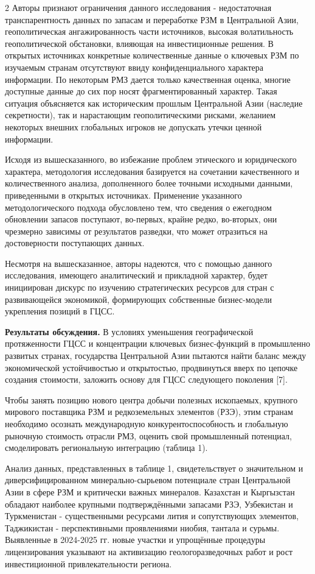 \begin{multicols}{2}
Авторы признают ограничения данного исследования - недостаточная
транспарентность данных по запасам и переработке РЗМ в Центральной Азии,
геополитическая ангажированность части источников, высокая волатильность
геополитической обстановки, влияющая на инвестиционные решения. В
открытых источниках конкретные количественные данные о ключевых РЗМ по
изучаемым странам отсутствуют ввиду конфиденциального характера
информации. По некоторым РМЗ дается только качественная оценка, многие
доступные данные до сих пор носят фрагментированный характер. Такая
ситуация объясняется как историческим прошлым Центральной Азии (наследие
секретности), так и нарастающим геополитическими рисками, желанием
некоторых внешних глобальных игроков не допускать утечки ценной
информации.

Исходя из вышесказанного, во избежание проблем этического и юридического
характера, методология исследования базируется на сочетании
качественного и количественного анализа, дополненного более точными
исходными данными, приведенными в открытых источниках. Применение
указанного методологического подхода обусловлено тем, что сведения о
ежегодном обновлении запасов поступают, во-первых, крайне редко,
во-вторых, они чрезмерно зависимы от результатов разведки, что может
отразиться на достоверности поступающих данных.

Несмотря на вышесказанное, авторы надеются, что с помощью данного
исследования, имеющего аналитический и прикладной характер, будет
инициирован дискурс по изучению стратегических ресурсов для стран с
развивающейся экономикой, формирующих собственные бизнес-модели
укрепления позиций в ГЦСС.

{\bfseries Результаты обсуждения.} В условиях уменьшения географической
протяженности ГЦСС и концентрации ключевых бизнес-функций в промышленно
развитых странах, государства Центральной Азии пытаются найти баланс
между экономической устойчивостью и открытостью, продвинуться вверх по
цепочке создания стоимости, заложить основу для ГЦСС следующего
поколения {[}7{]}.

Чтобы занять позицию нового центра добычи полезных ископаемых, крупного
мирового поставщика РЗМ и редкоземельных элементов (РЗЭ), этим странам
необходимо осознать международную конкурентоспособность и глобальную
рыночную стоимость отрасли РМЗ, оценить свой промышленный потенциал,
смоделировать региональную интеграцию (таблица 1).

Анализ данных, представленных в таблице 1, свидетельствует о
значительном и диверсифицированном минерально-сырьевом потенциале стран
Центральной Азии в сфере РЗМ и критически важных минералов. Казахстан и
Кыргызстан обладают наиболее крупными подтверждёнными запасами РЗЭ,
Узбекистан и Туркменистан - существенными ресурсами лития и
сопутствующих элементов, Таджикистан - перспективными проявлениями
ниобия, тантала и сурьмы. Выявленные в 2024-2025 гг. новые участки и
упрощённые процедуры лицензирования указывают на активизацию
геологоразведочных работ и рост инвестиционной привлекательности
региона.
\end{multicols}

